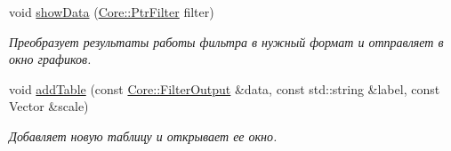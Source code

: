 \begin{DoxyCompactItemize}
\hypertarget{class_main_window_acf98b8c16421088a791c6d3d050ebc2d}{}\label{class_main_window_acf98b8c16421088a791c6d3d050ebc2d} 
void \hyperlink{class_main_window_acf98b8c16421088a791c6d3d050ebc2d}{show\+Data} (\hyperlink{namespace_core_afba80c2cb714c7d5793d9bcb9591e156}{Core\+::\+Ptr\+Filter} filter)
\begin{DoxyCompactList}\small\item\em Преобразует результаты работы фильтра в нужный формат и отправляет в окно графиков. \end{DoxyCompactList}\item 
\hypertarget{class_main_window_a2f45111c96d439beba735cd84e8deda7}{}\label{class_main_window_a2f45111c96d439beba735cd84e8deda7} 
void \hyperlink{class_main_window_a2f45111c96d439beba735cd84e8deda7}{add\+Table} (const \hyperlink{namespace_core_a60877581a235fc9566087b54d463ce9c}{Core\+::\+Filter\+Output} \&data, const std\+::string \&label, const Vector \&scale)
\begin{DoxyCompactList}\small\item\em Добавляет новую таблицу и открывает ее окно. \end{DoxyCompactList}\end{DoxyCompactItemize}
